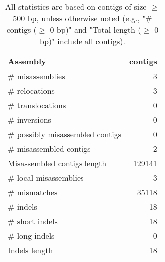\documentclass[12pt,a4paper]{article}
\begin{document}
\begin{table}[ht]
\begin{center}
\caption{All statistics are based on contigs of size $\geq$ 500 bp, unless otherwise noted (e.g., "\# contigs ($\geq$ 0 bp)" and "Total length ($\geq$ 0 bp)" include all contigs).}
\begin{tabular}{|l*{1}{|r}|}
\hline
Assembly & contigs \\ \hline
\# misassemblies & 3 \\ \hline
\hspace{5mm}\# relocations & 3 \\ \hline
\hspace{5mm}\# translocations & 0 \\ \hline
\hspace{5mm}\# inversions & 0 \\ \hline
\# possibly misassembled contigs & 0 \\ \hline
\# misassembled contigs & 2 \\ \hline
Misassembled contigs length & 129141 \\ \hline
\# local misassemblies & 3 \\ \hline
\# mismatches & 35118 \\ \hline
\# indels & 18 \\ \hline
\hspace{5mm}\# short indels & 18 \\ \hline
\hspace{5mm}\# long indels & 0 \\ \hline
Indels length & 18 \\ \hline
\end{tabular}
\end{center}
\end{table}
\end{document}
